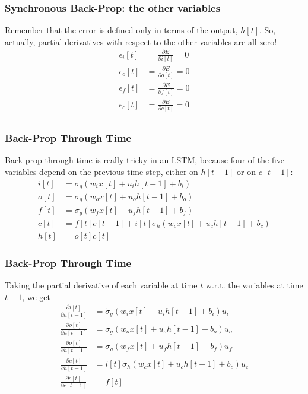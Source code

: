\documentclass{beamer}
\begin{document}
\begin{frame}
  \frametitle{Synchronous Back-Prop: the other variables}

  Remember that the error is defined only in terms of the output,
  $h[t]$.  So, actually, partial derivatives with respect to the other
  variables are all zero!
  \begin{align*}
    \epsilon_i[t] &=\frac{\partial E}{\partial i[t]} = 0\\
    \epsilon_o[t] &=\frac{\partial E}{\partial o[t]} = 0\\
    \epsilon_f[t] &=\frac{\partial E}{\partial f[t]} = 0\\
    \epsilon_c[t] &=\frac{\partial E}{\partial c[t]} = 0\\
  \end{align*}
\end{frame}

\begin{frame}
  \frametitle{Back-Prop Through Time}
  Back-prop through time is really tricky in an LSTM, because four of the five
  variables depend on the previous time step, either on $h[t-1]$ or on $c[t-1]$:
  \begin{align*}
    i[t] &=\sigma_g(w_i x[t]+u_i h[t-1]+b_i)\\
    o[t] &=\sigma_g(w_o x[t]+u_o h[t-1]+b_o)\\
    f[t] &=\sigma_g(w_f x[t]+u_f h[t-1]+b_f)\\
    c[t] &=f[t]c[t-1]+i[t]\sigma_h\left(w_cx[t]+u_ch[t-1]+b_c\right)\\
    h[t] &=o[t]c[t]
  \end{align*}
\end{frame}

\begin{frame}
  \frametitle{Back-Prop Through Time}

  Taking the partial derivative of each variable at time $t$
  w.r.t. the variables at time $t-1$, we get
  \begin{align*}
    \frac{\partial i[t]}{\partial h[t-1]}
    &=\dot\sigma_g(w_i x[t]+u_i h[t-1]+b_i)u_i\\
    \frac{\partial o[t]}{\partial h[t-1]}
    &=\dot\sigma_g(w_o x[t]+u_o h[t-1]+b_o)u_o\\
    \frac{\partial o[t]}{\partial h[t-1]}
    &=\dot\sigma_g(w_f x[t]+u_f h[t-1]+b_f)u_f\\
    \frac{\partial c[t]}{\partial h[t-1]}
    &=i[t]\dot\sigma_h\left(w_cx[t]+u_ch[t-1]+b_c\right)u_c\\
    \frac{\partial c[t]}{\partial c[t-1]}
    &=f[t]
  \end{align*}
\end{frame}
\end{document}

